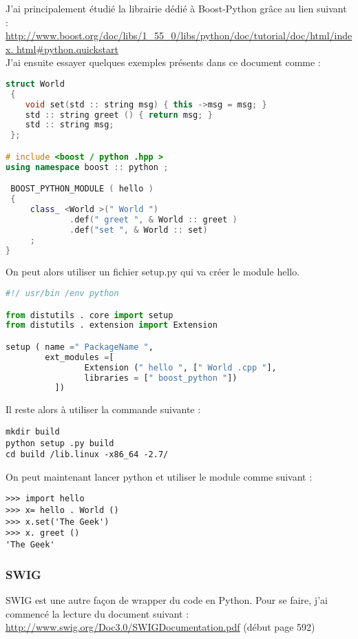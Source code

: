 \documentclass[12pt]{article}
\begin{document}
J'ai principalement étudié la librairie dédié à Boost-Python grâce au lien suivant :\\
\newline
\url{http://www.boost.org/doc/libs/1_55_0/libs/python/doc/tutorial/doc/html/index.
html#python.quickstart}\\

J'ai ensuite essayer quelques exemples présents dans ce document comme :

\begin{lstlisting}[language=C++]
 struct World
 {
 	void set(std :: string msg) { this ->msg = msg; }
 	std :: string greet () { return msg; }
 	std :: string msg;
 };

# include <boost / python .hpp >
using namespace boost :: python ;

 BOOST_PYTHON_MODULE ( hello )
 {
	 class_ <World >(" World ")
			 .def(" greet ", & World :: greet )
 		 	 .def("set ", & World :: set)
	 ;
}
\end{lstlisting}

On peut alors utiliser un fichier setup.py qui va créer le module hello.

\begin{lstlisting}[language=python]
#!/ usr/bin /env python

from distutils . core import setup
from distutils . extension import Extension

setup ( name =" PackageName ",
		ext_modules =[
 				Extension (" hello ", [" World .cpp "],
 				libraries = [" boost_python "])
		  ])
\end{lstlisting}

Il reste alors à utiliser la commande suivante :

\begin{lstlisting}
mkdir build
python setup .py build
cd build /lib.linux -x86_64 -2.7/
\end{lstlisting}

On peut maintenant lancer python et utiliser le module comme suivant :

\begin{lstlisting}
>>> import hello
>>> x= hello . World ()
>>> x.set('The Geek')
>>> x. greet ()
'The Geek'
\end{lstlisting}


\subsubsection{SWIG}

SWIG est une autre façon de wrapper du code en Python. Pour se faire, j'ai commencé la lecture du document suivant :\\
\url{http://www.swig.org/Doc3.0/SWIGDocumentation.pdf} (début page 592) \\
\end{document}
